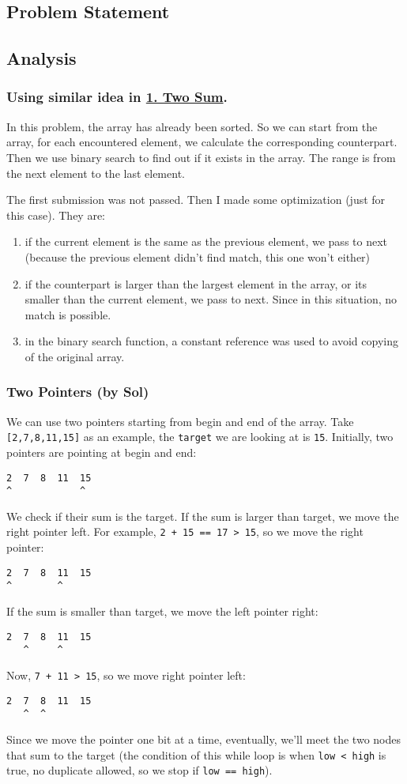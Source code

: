 \documentclass[11pt]{article}
\begin{document}
\subsection{Problem Statement}
\label{sec:org5a9044d}
\subsection{Analysis}
\label{sec:org0aaa750}
\subsubsection{Using similar idea in \hyperref[org6d55649]{1. Two Sum}.}
\label{sec:org4f10589}
In this problem, the array has already been sorted. So we can start from the array, for each encountered element, we calculate the corresponding counterpart. Then we use binary search to find out if it exists in the array. The range is from the next element to the last element.

The first submission was not passed. Then I made some optimization (just for this case). They are:
\begin{enumerate}
\item if the current element is the same as the previous element, we pass to next (because the previous element didn't find match, this one won't either)
\item if the counterpart is larger than the largest element in the array, or its smaller than the current element, we pass to next. Since in this situation, no match is possible.
\item in the binary search function, a constant reference was used to avoid copying of the original array.
\end{enumerate}
\subsubsection{Two Pointers (by Sol)}
\label{sec:org2f2051c}
We can use two pointers starting from begin and end of the array. Take \texttt{[2,7,8,11,15]} as an example, the \texttt{target} we are looking at is \texttt{15}. Initially, two pointers are pointing at begin and end:
\begin{Verbatim}[frame=single]
2  7  8  11  15
^            ^
\end{Verbatim}
We check if their sum is the target. If the sum is larger than target, we move the right pointer left. For example, \texttt{2 + 15 == 17 > 15}, so we move the right pointer:
\begin{Verbatim}[frame=single]
2  7  8  11  15
^        ^
\end{Verbatim}
If the sum is smaller than target, we move the left pointer right:
\begin{Verbatim}[frame=single]
2  7  8  11  15
   ^     ^
\end{Verbatim}
Now, \texttt{7 + 11 > 15}, so we move right pointer left:
\begin{Verbatim}[frame=single]
2  7  8  11  15
   ^  ^
\end{Verbatim}
Since we move the pointer one bit at a time, eventually, we'll meet the two nodes that sum to the target (the condition of this while loop is when \texttt{low < high} is true, no duplicate allowed, so we stop if \texttt{low == high}).
\end{document}
